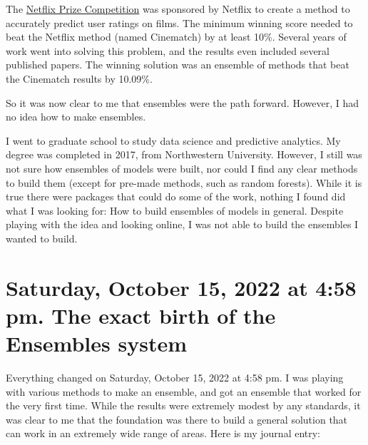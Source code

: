 \documentclass[
]{book}
\begin{document}
The \href{https://en.wikipedia.org/wiki/Netflix_Prize}{Netflix Prize
Competition} was sponsored
by Netflix to create a method to accurately predict user ratings on
films. The minimum winning score needed to beat the Netflix method
(named Cinematch) by at least 10\%. Several years of work went into
solving this problem, and the results even included several published
papers. The winning solution was an ensemble of methods that beat the
Cinematch results by 10.09\%.

So it was now clear to me that ensembles were the path forward. However,
I had no idea how to make ensembles.

I went to graduate school to study data science and predictive
analytics. My degree was completed in 2017, from Northwestern
University. However, I still was not sure how ensembles of models were
built, nor could I find any clear methods to build them (except for
pre-made methods, such as random forests). While it is true there were
packages that could do some of the work, nothing I found did what I was
looking for: How to build ensembles of models in general. Despite
playing with the idea and looking online, I was not able to build the
ensembles I wanted to build.

\section{Saturday, October 15, 2022 at 4:58 pm. The exact birth of the Ensembles system}\label{saturday-october-15-2022-at-458-pm.-the-exact-birth-of-the-ensembles-system}

Everything changed on Saturday, October 15, 2022 at 4:58 pm. I was
playing with various methods to make an ensemble, and got an ensemble
that worked for the very first time. While the results were extremely
modest by any standards, it was clear to me that the foundation was
there to build a general solution that can work in an extremely wide
range of areas. Here is my journal entry:
\end{document}
